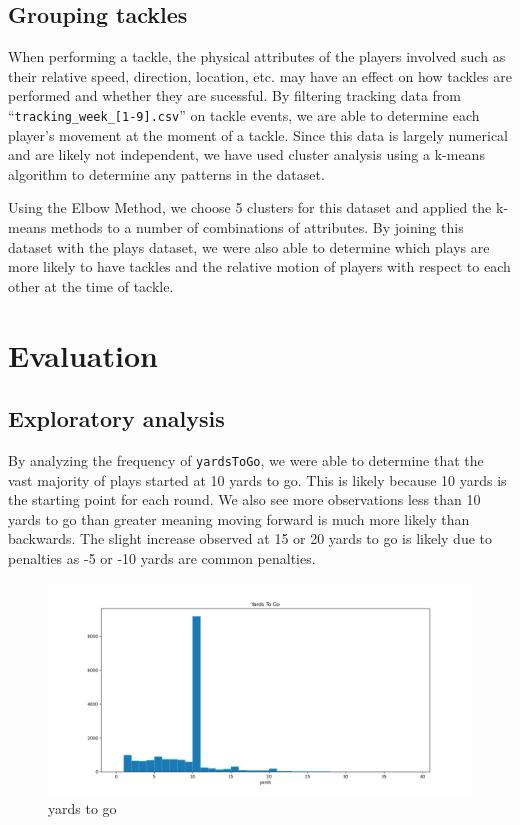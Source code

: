 \documentclass[bibtex, sigconf, hyperref={colorlinks=true,linkcolor=blue,urlcolor=blue}]{acmart}
\begin{document}
\subsection{Grouping tackles}
When performing a tackle, the physical attributes of the players involved such
as their relative speed, direction, location, etc. may have an effect on how
tackles are performed and whether they are sucessful.
By filtering tracking data from ``\verb|tracking_week_[1-9].csv|'' on tackle
events, we are able to determine each player's movement at the moment of a tackle.
Since this data is largely numerical and are likely not independent, we have
used cluster analysis using a k-means algorithm to determine any patterns in the
dataset.

Using the Elbow Method, we choose 5 clusters for this dataset and applied the
k-means methods to a number of combinations of attributes. By joining this
dataset with the plays dataset, we were also able to determine which plays are
more likely to have tackles and the relative motion of players with respect to
each other at the time of tackle.

\section{Evaluation}

\subsection{Exploratory analysis}

By analyzing the frequency of \verb|yardsToGo|, we were able to determine that
the vast majority of plays started at 10 yards to go. This is likely because
10 yards is the starting point for each round. We also see more observations
less than 10 yards to go than greater meaning moving forward is much more likely
than backwards. The slight increase observed at 15 or 20 yards to go is likely
due to penalties as -5 or -10 yards are common penalties.

\begin{figure}[h]
  \centering
  \includegraphics[width=\linewidth]{../src/yards.png}
  \caption{yards to go}
\end{figure}
\end{document}
